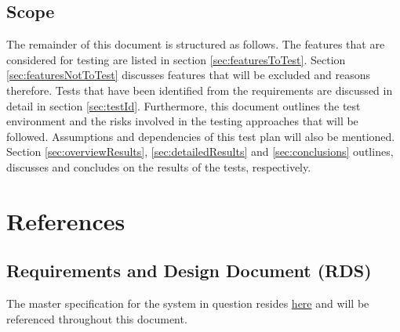 \subsection{Scope}
The remainder of this document is structured as follows. The features that are considered for testing are listed in section \ref{sec:featuresToTest}. Section \ref{sec:featuresNotToTest} discusses features that will be excluded and reasons therefore. Tests that have been identified from the requirements are discussed in detail in section \ref{sec:testId}. Furthermore, this document outlines the test environment and the risks involved in the testing approaches that will be followed. Assumptions and dependencies of this test plan will also be mentioned. Section \ref{sec:overviewResults}, \ref{sec:detailedResults} and \ref{sec:conclusions} outlines, discusses and concludes on the results of the tests, respectively.

\section{References} \label{sec:references}
\subsection{Requirements and Design Document (RDS)}
\hypersetup{
	linkcolor = blue
}
The master specification for the system in question resides \href{https://clickup.up.ac.za/bbcswebdav/pid-791422-dt-content-rid-8256558_1/xid-8256558_1}{here} and will be referenced throughout this document.
\hypersetup{
	linkcolor = black
}
